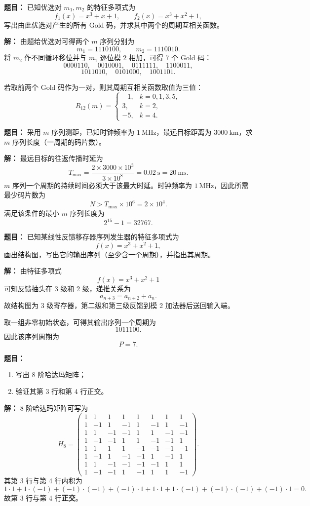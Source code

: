 \medskip
{}
\textbf{题目：}
已知优选对 $m_1,m_2$ 的特征多项式为
\[
f_1(x)=x^3+x+1,\qquad f_2(x)=x^3+x^2+1,
\]
写出由此优选对产生的所有 Gold 码，并求其中两个的周期互相关函数。

\par\textbf{解：}
由题给优选对可得两个 $m$ 序列分别为
\[
m_1=1110100,\qquad m_2=1110010.
\]
将 $m_2$ 作不同循环移位并与 $m_1$ 逐位模 2 相加，可得 7 个 Gold 码：
\[
0000110,\quad 0010001,\quad 0111111,\quad 1100011,
\]
\[
1011010,\quad 0101000,\quad 1001101.
\]

若取前两个 Gold 码作为一对，则其周期互相关函数取值为三值：
\[
R_{12}(m)=
\begin{cases}
-1, & k=0,1,3,5,\\
3, & k=2,\\
-5, & k=4.
\end{cases}
\]

\medskip
{}
\textbf{题目：}
采用 $m$ 序列测距，已知时钟频率为 $1\ \text{MHz}$，最远目标距离为 $3000\ \text{km}$，求 $m$ 序列长度（一周期的码片数）。

\par\textbf{解：}
最远目标的往返传播时延为
\[
T_{\max}=\frac{2\times 3000\times 10^3}{3\times 10^8}=0.02\ \text{s}=20\ \text{ms}.
\]
$m$ 序列一个周期的持续时间必须大于该最大时延。时钟频率为 $1\ \text{MHz}$，因此所需最少码片数为
\[
N>T_{\max}\times 10^6=2\times 10^4.
\]
满足该条件的最小 $m$ 序列长度为
\[
2^{15}-1=32767.
\]

\medskip
{}
\textbf{题目：}
已知某线性反馈移存器序列发生器的特征多项式为
\[
f(x)=x^3+x^2+1,
\]
画出结构图，写出它的输出序列（至少含一个周期），并指出其周期。

\par\textbf{解：}
由特征多项式
\[
f(x)=x^3+x^2+1
\]
可知反馈抽头在 3 级和 2 级，递推关系为
\[
a_{n+3}=a_{n+2}+a_n.
\]
故结构图为 3 级寄存器，第二级和第三级反馈到模 2 加法器后送回输入端。

取一组非零初始状态，可得其输出序列一个周期为
\[
1011100.
\]
因此该序列周期为
\[
P=7.
\]

\medskip
{}
\textbf{题目：}
\begin{enumerate}
\item 写出 8 阶哈达玛矩阵；
\item 验证其第 3 行和第 4 行正交。
\end{enumerate}

\par\textbf{解：}
8 阶哈达玛矩阵可写为
\[
H_8=
\begin{pmatrix}
1&1&1&1&1&1&1&1\\
1&-1&1&-1&1&-1&1&-1\\
1&1&-1&-1&1&1&-1&-1\\
1&-1&-1&1&1&-1&-1&1\\
1&1&1&1&-1&-1&-1&-1\\
1&-1&1&-1&-1&1&-1&1\\
1&1&-1&-1&-1&-1&1&1\\
1&-1&-1&1&-1&1&1&-1
\end{pmatrix}.
\]
其第 3 行与第 4 行内积为
\[
1\cdot 1+1\cdot(-1)+(-1)\cdot(-1)+(-1)\cdot 1+1\cdot 1+1\cdot(-1)+(-1)\cdot(-1)+(-1)\cdot 1=0.
\]
故第 3 行与第 4 行\textbf{正交}。


